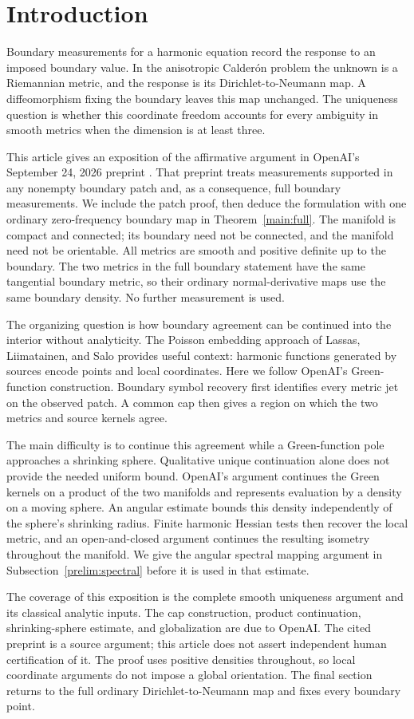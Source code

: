 \section{Introduction}
Boundary measurements for a harmonic equation record the response to an
imposed boundary value. In the anisotropic Calder\'on problem the unknown
is a Riemannian metric, and the response is its Dirichlet-to-Neumann map.
A diffeomorphism fixing the boundary leaves this map unchanged. The
uniqueness question is whether this coordinate freedom accounts for
every ambiguity in smooth metrics when the dimension is at least three.

This article gives an exposition of the affirmative argument in OpenAI's
September 24, 2026 preprint \citep{OpenAI2026}. That preprint treats
measurements supported in any nonempty boundary patch and, as a
consequence, full boundary measurements. We include the patch proof,
then deduce the formulation with one ordinary zero-frequency boundary
map in Theorem~\ref{main:full}. The manifold is compact and connected;
its boundary need not be connected, and the manifold need not be
orientable. All metrics are smooth and positive definite up to the
boundary. The two metrics in the full boundary statement have the same
tangential boundary metric, so their ordinary normal-derivative maps
use the same boundary density. No further measurement is used.

The organizing question is how boundary agreement can be continued into
the interior without analyticity. The Poisson embedding approach of
Lassas, Liimatainen, and Salo \citep{LLS20} provides useful context:
harmonic functions generated by sources encode points and local
coordinates. Here we follow OpenAI's Green-function construction.
Boundary symbol recovery first identifies every metric jet on the
observed patch. A common cap then gives a region on which the two
metrics and source kernels agree.

The main difficulty is to continue this agreement while a Green-function
pole approaches a shrinking sphere. Qualitative unique continuation
alone does not provide the needed uniform bound. OpenAI's argument
continues the Green kernels on a product of the two manifolds and
represents evaluation by a density on a moving sphere. An angular
estimate bounds this density independently of the sphere's shrinking
radius. Finite harmonic Hessian tests then recover the local metric,
and an open-and-closed argument continues the resulting isometry
throughout the manifold. We give the angular spectral mapping argument
in Subsection~\ref{prelim:spectral} before it is used in that estimate.

The coverage of this exposition is the complete smooth uniqueness
argument and its classical analytic inputs. The cap construction,
product continuation, shrinking-sphere estimate, and globalization
are due to OpenAI. The cited preprint is a source argument; this article
does not assert independent human certification of it. The proof uses
positive densities throughout, so local coordinate arguments do not
impose a global orientation. The final section returns to the full
ordinary Dirichlet-to-Neumann map and fixes every boundary point.
